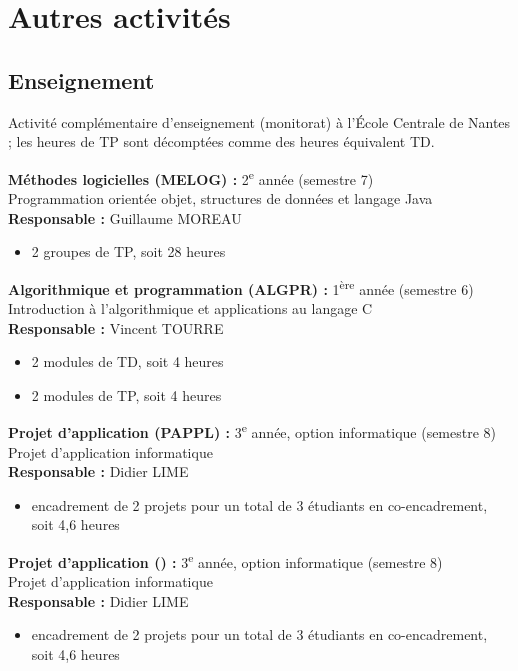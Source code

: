 \chapter{Autres activités}

\section{Enseignement}

Activité complémentaire d'enseignement (monitorat) à l'École Centrale de Nantes ; les heures de TP sont décomptées comme des heures équivalent TD.


\bigskip

\noindent
\textbf{Méthodes logicielles (MELOG) :} 2\textsuperscript{e} année (semestre 7)\\
Programmation orientée objet, structures de données et langage Java\\
\textbf{Responsable :} Guillaume MOREAU
\begin{itemize}
  \item 2 groupes de TP, soit 28 heures
\end{itemize}

\bigskip\noindent
\textbf{Algorithmique et programmation (ALGPR) :} 1\textsuperscript{ère} année (semestre 6)\\
Introduction à l'algorithmique et applications au langage C\\
\textbf{Responsable :} Vincent TOURRE
\begin{itemize}
  \item 2 modules de TD, soit 4 heures
  \item 2 modules de TP, soit 4 heures
\end{itemize}

\bigskip\noindent
\textbf{Projet d'application (PAPPL) :} 3\textsuperscript{e} année, option informatique (semestre 8)\\
Projet d'application informatique\\
\textbf{Responsable :} Didier LIME
\begin{itemize}
  \item encadrement de 2 projets pour un total de 3 étudiants en co-encadrement, soit 4,6 heures
\end{itemize}

\bigskip\noindent
\textbf{Projet d'application () :} 3\textsuperscript{e} année, option informatique (semestre 8)\\
Projet d'application informatique\\
\textbf{Responsable :} Didier LIME
\begin{itemize}
  \item encadrement de 2 projets pour un total de 3 étudiants en co-encadrement, soit 4,6 heures
\end{itemize}

